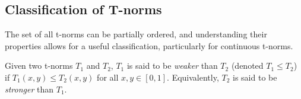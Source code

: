   







\subsection{Classification of T-norms}


The set of all t-norms can be partially ordered, and understanding their properties allows for a useful classification, particularly for continuous t-norms.

\begin{definition}
  Given two t-norms $T_1$ and $T_2$, $T_1$ is said to be \emph{weaker} than $T_2$ (denoted $T_1 \leq T_2$) if $T_1(x,y) \leq T_2(x,y)$ for all $x,y \in [0,1]$.
  Equivalently, $T_2$ is said to be \emph{stronger} than $T_1$.
\end{definition}


